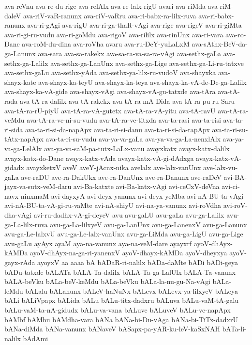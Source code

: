 {ava-reVnu
ava-re-du-rige
ava-relAlx
ava-re-lalx-rigU
avari
ava-riMda
ava-riM-daleV
ava-riV-vaR-ranunx
ava-riV-vaRru
ava-ri-babx-ra-lilx-ruva
ava-ri-babx-ranunx
ava-ri-gAgi
ava-rigU
ava-ri-ga-thaR-vAgi
ava-rige
ava-rigeV
ava-ri-giMta
ava-ri-gi-ru-vudu
ava-ri-goMdu
ava-rigoV
ava-rililx
ava-rinUnx
ava-ri-vara
ava-ro-Dane
ava-roM-du-dina
ava-roVha
avaru
ava-ru-DeY-yuLaLxM
ava-sAthx-BeV-da-ga-Lanunx
ava-sara
ava-sa-rakekx
ava-sa-ra-va-sa-ra-vAgi
ava-sethx-gaLa
ava-sethx-ga-Lalilx
ava-sethx-ga-LanUnx
ava-sethx-ga-Lige
ava-sethx-ga-Li-ru-tatxve
ava-sethx-gaLu
ava-sethx-yAda
ava-sethx-ya-lilx-ru-vudoV
ava-shayxka
ava-shayx-kate
ava-shayx-ka-teyU
ava-shayx-ka-teya
ava-shayx-ka-vA-de-De-ga-Lalilx
ava-shayx-ka-vA-gide
ava-shayx-vAgi
ava-shayx-vA-gu-tatxde
ava-tAra
ava-tA-rada
ava-tA-ra-dalilx
ava-tA-rakekx
ava-tA-ra-mA-Dida
ava-tA-ra-pu-ru-Saru
ava-tA-ra-rU-piyU
ava-tA-ra-vA-gutetx
ava-tA-ra-vA-yitu
ava-tA-ravU
ava-tA-ra-veMdu
ava-tA-ra-ve-ni-su-vudu
ava-tA-ra-ve-titxda
ava-ta-rasi
ava-ta-risi
ava-ta-ri-sida
ava-ta-ri-si-da-napApx
ava-ta-ri-si-danu
ava-ta-ri-si-da-rapApx
ava-ta-ri-su-tAtx-napApx
ava-ta-ri-su-vudu
ava-ya-va-gaLa
ava-ya-va-ga-La-nenxlAlx
ava-ya-va-ga-LelAlx
ava-ya-va-saM-pa-tutx-LaLx-vanu
avayxkatx
avayx-katx-dalilx
avayx-katx-do-Dane
avayx-katx-vAda
avayx-katx-vA-gi-dAdxga
avayx-katx-vA-gidadx
avayxketxV
aveV
aveY-jAcnx-nika
avelalx
ave-lalx-vanUnx
ave-lalx-vu-gaLa
ave-raDU
ave-ra-DakUkx
ave-ra-DanUnx
ave-ra-Danunx
ave-raDeV
avi-BA-jayx-va-sutx-veM-daru
avi-Ba-katxte
avi-Ba-katx-vAgi
avi-ceCxV-deVna
avi-ci-navx-ninxmaM
avi-dayxyA
avi-deyx-yanunx
avi-deyx-yeMba
avi-nA-BU-ta-vAgi
avi-nA-BU-ta-vA-gi-ru-vaMte
avi-nA-shiyU
avi-na-ya-vanunx
avi-roVdha
avi-roV-dha-vAgi
avi-ru-dadhx-vA-gi-deyeV
avu
avu-gaLU
avu-gaLa
avu-ga-Lalilx
avu-ga-La-lilx-ruva
avu-ga-La-lilxyeV
avu-ga-LanUnx
avu-ga-LanenxV
avu-ga-Lanunx
avu-ga-Le-lalxvU
avu-ga-Le-lalx-vanUnx
avu-ga-LiMda
avu-ga-LigU
avu-ga-Lige
avu-gaLu
ayAyx
ayaM
aya-na-vanunx
aya-na-veM-dare
ayayxrf
ayoV-dhAyx-kAMDa
ayoV-dhAyx-na-ga-ri-yanenxV
ayoV-dhayx-kAMDa
ayoV-dheyxya
ayoV-gayx-rAda
ayoyxV
a‌a
a‌aa‌a
bA
bADaR-ri-nalilx
bADa-daMte
bADi
bADi-geya
bADu-tatxde
bALATa
bALA-Ta-dalilx
bALA-Ta-ga-LalUlx
bALA-Ta-vanunx
bALA-beVku
bALa-beV-keMdu
bALa-beVku
bALa-la-nu-gu-Na-vAgi
bALa-leMdu
bALalu
bALanunx
bALeV-haNuNx
bALevx
bALevx-ya-lilxyeV
bALeya
bALi
bALiVpapx
bALida
bALu
bALu-titx-dadxru
bALuva
bALu-vaM-tA-galu
bALu-vaM-ta-nA-gidudx
bALu-va-vana
bALuve
bALuveV
bALu-ve-napApx
bAMbf
bAMbu
bAMdha-vara
bANa
bANa-bi-Du-vAga
bANa-bi-TiTx-dadxrU
bANa-diMda
bANa-vanunx
bANaveV
bASapx-pa-yAR-ku-leV-kaSxNAH
bATa-li-nalilx
bAdAmi
}
